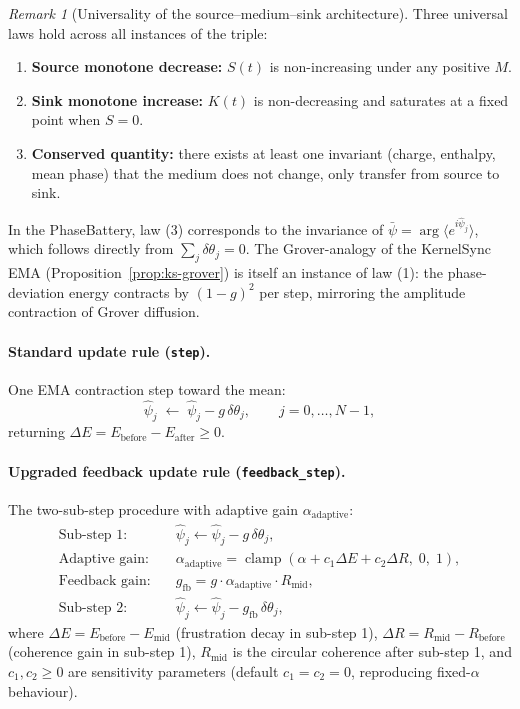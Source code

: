 \documentclass[12pt,a4paper]{article}
\theoremstyle{plain}
\theoremstyle{definition}
\theoremstyle{remark}
\newtheorem{remark}[theorem]{Remark}
\begin{document}
\begin{remark}[Universality of the source--medium--sink architecture]
  Three universal laws hold across all instances of the triple:
  \begin{enumerate}
    \item \textbf{Source monotone decrease:} $S(t)$ is non-increasing under
      any positive $M$.
    \item \textbf{Sink monotone increase:} $K(t)$ is non-decreasing and
      saturates at a fixed point when $S=0$.
    \item \textbf{Conserved quantity:} there exists at least one invariant
      (charge, enthalpy, mean phase) that the medium does not change, only
      transfer from source to sink.
  \end{enumerate}
  In the PhaseBattery, law (3) corresponds to the invariance of
  $\bar\psi = \arg\langle e^{i\hat\psi_j}\rangle$,
  which follows directly from $\sum_j\delta\theta_j = 0$.
  The Grover-analogy of the KernelSync EMA
  (Proposition~\ref{prop:ks-grover}) is itself an instance of law (1): the
  phase-deviation energy contracts by $(1-g)^2$ per step, mirroring the
  amplitude contraction of Grover diffusion.
\end{remark}

\paragraph{Standard update rule (\texttt{step}).}
One EMA contraction step toward the mean:
\begin{equation}
  \hat\psi_j \;\leftarrow\; \hat\psi_j - g\,\delta\theta_j,
  \qquad j = 0,\ldots,N-1,
  \label{eq:battery-step}
\end{equation}
returning $\Delta E = E_{\mathrm{before}} - E_{\mathrm{after}} \ge 0$.

\paragraph{Upgraded feedback update rule (\texttt{feedback\_step}).}
The two-sub-step procedure with adaptive gain $\alpha_{\mathrm{adaptive}}$:
\begin{align}
  \text{Sub-step 1:} &\quad
    \hat\psi_j \leftarrow \hat\psi_j - g\,\delta\theta_j,
    \label{eq:fb-sub1}\\
  \text{Adaptive gain:} &\quad
    \alpha_{\mathrm{adaptive}} = \operatorname{clamp}(
      \alpha + c_1\Delta E + c_2\Delta R,\; 0,\; 1),
    \label{eq:fb-alpha}\\
  \text{Feedback gain:} &\quad
    g_{\mathrm{fb}} = g\cdot\alpha_{\mathrm{adaptive}}\cdot R_{\mathrm{mid}},
    \label{eq:fb-gain}\\
  \text{Sub-step 2:} &\quad
    \hat\psi_j \leftarrow \hat\psi_j - g_{\mathrm{fb}}\,\delta\theta_j,
    \label{eq:fb-sub2}
\end{align}
where $\Delta E = E_{\mathrm{before}} - E_{\mathrm{mid}}$ (frustration decay
in sub-step 1), $\Delta R = R_{\mathrm{mid}} - R_{\mathrm{before}}$ (coherence
gain in sub-step 1), $R_{\mathrm{mid}}$ is the circular coherence after
sub-step 1, and $c_1, c_2 \ge 0$ are sensitivity parameters
(default $c_1 = c_2 = 0$, reproducing fixed-$\alpha$ behaviour).
\end{document}
